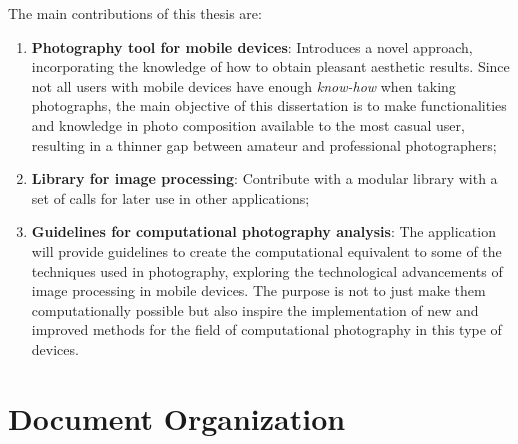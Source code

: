The main contributions of this thesis are:
\begin{enumerate}
	\item \textbf{Photography tool for mobile devices}: Introduces a novel approach, incorporating the knowledge of how to obtain pleasant aesthetic results. Since not all users with mobile devices have enough \emph{know-how} when taking photographs, the main objective of this dissertation is to make functionalities and knowledge in photo composition available to the most casual user, resulting in a thinner gap between amateur and professional photographers;

	\item \textbf{Library for image processing}: Contribute with a modular library with a set of calls for later use in other applications;
	
	\item \textbf{Guidelines for computational photography analysis}: The application will provide guidelines to create the computational equivalent to some of the techniques used in photography, exploring the technological advancements of image processing in mobile devices. The purpose is not to just make them computationally possible but also inspire the implementation of new and improved methods for the field of computational photography in this type of devices.
	
\end{enumerate}

\section{Document Organization}
\label{sec:aperture}